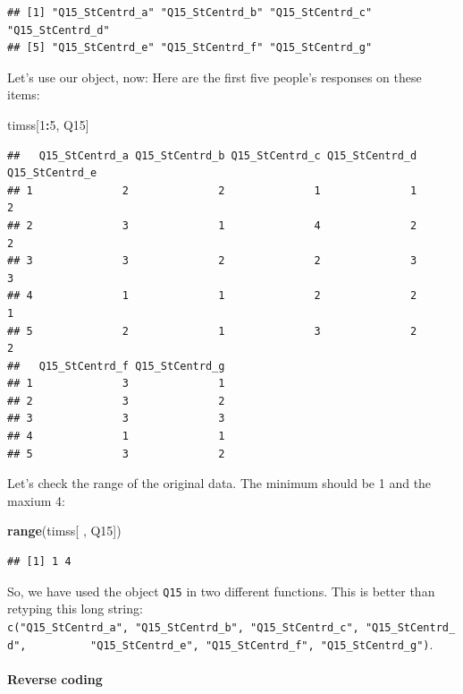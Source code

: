 \documentclass[
]{article}
\newenvironment{Shaded}{\begin{snugshade}}{\end{snugshade}}
\newcommand{\DecValTok}[1]{\textcolor[rgb]{0.00,0.00,0.81}{#1}}
\newcommand{\KeywordTok}[1]{\textcolor[rgb]{0.13,0.29,0.53}{\textbf{#1}}}
\newcommand{\NormalTok}[1]{#1}
\newcommand{\OperatorTok}[1]{\textcolor[rgb]{0.81,0.36,0.00}{\textbf{#1}}}
\begin{document}
\begin{verbatim}
## [1] "Q15_StCentrd_a" "Q15_StCentrd_b" "Q15_StCentrd_c" "Q15_StCentrd_d"
## [5] "Q15_StCentrd_e" "Q15_StCentrd_f" "Q15_StCentrd_g"
\end{verbatim}

Let's use our object, now: Here are the first five people's responses on these items:

\begin{Shaded}
\begin{Highlighting}[]
\NormalTok{timss[}\DecValTok{1}\OperatorTok{:}\DecValTok{5}\NormalTok{, Q15]}
\end{Highlighting}
\end{Shaded}

\begin{verbatim}
##   Q15_StCentrd_a Q15_StCentrd_b Q15_StCentrd_c Q15_StCentrd_d Q15_StCentrd_e
## 1              2              2              1              1              2
## 2              3              1              4              2              2
## 3              3              2              2              3              3
## 4              1              1              2              2              1
## 5              2              1              3              2              2
##   Q15_StCentrd_f Q15_StCentrd_g
## 1              3              1
## 2              3              2
## 3              3              3
## 4              1              1
## 5              3              2
\end{verbatim}

Let's check the range of the original data. The minimum should be 1 and the maxium 4:

\begin{Shaded}
\begin{Highlighting}[]
\KeywordTok{range}\NormalTok{(timss[ , Q15])}
\end{Highlighting}
\end{Shaded}

\begin{verbatim}
## [1] 1 4
\end{verbatim}

So, we have used the object \texttt{Q15} in two different functions. This is better than retyping this long string: \texttt{c("Q15\_StCentrd\_a",\ "Q15\_StCentrd\_b",\ "Q15\_StCentrd\_c",\ "Q15\_StCentrd\_d",\ \ \ \ \ \ \ \ \ \ "Q15\_StCentrd\_e",\ "Q15\_StCentrd\_f",\ "Q15\_StCentrd\_g")}.

\hypertarget{reverse-coding}{%
\paragraph{Reverse coding}\label{reverse-coding}}
\end{document}
